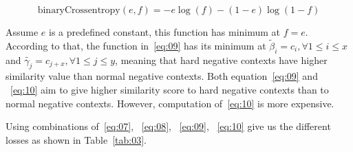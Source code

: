 \documentclass[3p, sort&compress, 12pt]{elsarticle}
\begin{document}
\begin{equation}
	\label{eq:11}
	\text{binaryCrossentropy}(e, f) = -e\log(f) - (1-e)\log(1-f)
\end{equation}
\par Assume $e$ is a predefined constant, this function has minimum at $f=e$. According to that, the function in~\eqref{eq:09} has its minimum at $\tilde{\beta}_i = c_{i}, \forall 1 \leq i \leq x$ and $\tilde{\gamma_j}=c_{j + x}, \forall 1\leq j\leq y$, meaning that hard negative contexts have higher similarity value than normal negative contexts. Both equation~\eqref{eq:09} and ~\eqref{eq:10} aim to give higher similarity score to hard negative contexts than to normal negative contexts. However, computation of~\eqref{eq:10} is more expensive.
\par Using combinations of~\eqref{eq:07}, ~\eqref{eq:08}, ~\eqref{eq:09}, ~\eqref{eq:10} give us the different losses as shown in Table~\ref{tab:03}.
\end{document}
